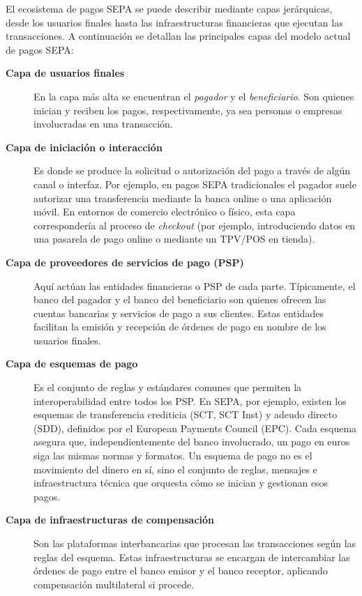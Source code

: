 El ecosistema de pagos SEPA se puede describir mediante capas jerárquicas, desde los usuarios finales hasta las infraestructuras financieras que ejecutan las transacciones. A continuación se detallan las principales capas del modelo actual de pagos SEPA:

\begin{description}
  \item[\textbf{Capa de usuarios finales}] 
    En la capa más alta se encuentran el \emph{pagador} y el \emph{beneficiario}. Son quienes inician y reciben los pagos, respectivamente, ya sea personas o empresas involucradas en una transacción.

  \item[\textbf{Capa de iniciación o interacción}] 
    Es donde se produce la solicitud o autorización del pago a través de algún canal o interfaz. Por ejemplo, en pagos SEPA tradicionales el pagador suele autorizar una transferencia mediante la banca online o una aplicación móvil. En entornos de comercio electrónico o físico, esta capa correspondería al proceso de \emph{checkout} (por ejemplo, introduciendo datos en una pasarela de pago online o mediante un TPV/POS en tienda).

  \item[\textbf{Capa de proveedores de servicios de pago (PSP)}] 
    Aquí actúan las entidades financieras o PSP de cada parte. Típicamente, el banco del pagador y el banco del beneficiario son quienes ofrecen las cuentas bancarias y servicios de pago a sus clientes. Estas entidades facilitan la emisión y recepción de órdenes de pago en nombre de los usuarios finales.

  \item[\textbf{Capa de esquemas de pago}] 
    Es el conjunto de reglas y estándares comunes que permiten la interoperabilidad entre todos los PSP. En SEPA, por ejemplo, existen los esquemas de transferencia crediticia (SCT, SCT Inst) y adeudo directo (SDD), definidos por el European Payments Council (EPC). Cada esquema asegura que, independientemente del banco involucrado, un pago en euros siga las mismas normas y formatos. Un esquema de pago no es el movimiento del dinero en sí, sino el conjunto de reglas, mensajes e infraestructura técnica que orquesta cómo se inician y gestionan esos pagos.

  \item[\textbf{Capa de infraestructuras de compensación}] 
    Son las plataformas interbancarias que procesan las transacciones según las reglas del esquema. Estas infraestructuras se encargan de intercambiar las órdenes de pago entre el banco emisor y el banco receptor, aplicando compensación multilateral si procede.


\end{description}
